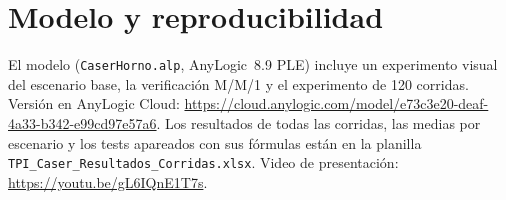 \documentclass[a4paper,11pt]{article}
\begin{document}
\section*{Modelo y reproducibilidad}

El modelo (\texttt{CaserHorno.alp}, AnyLogic~8.9 PLE) incluye un experimento visual del escenario base, la
verificación M/M/1 y el experimento de 120 corridas. Versión en AnyLogic Cloud: \url{https://cloud.anylogic.com/model/e73c3e20-deaf-4a33-b342-e99cd97e57a6}.
Los resultados de todas las corridas, las medias por escenario y los tests apareados con sus fórmulas están en
la planilla \texttt{TPI\_Caser\_Resultados\_Corridas.xlsx}. Video de presentación: \url{https://youtu.be/gL6IQnE1T7s}.



\end{document}
